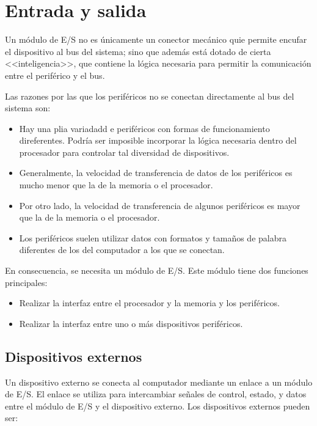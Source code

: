 \section{Entrada y salida}

Un módulo de E/S no es únicamente un conector mecánico quie permite encufar el dispositivo al bus del sistema; sino que además está dotado de cierta <<inteligencia>>, que contiene la lógica necesaria para permitir la comunicación entre el periférico y el bus.

Las razones por las que los periféricos no se conectan directamente al bus del sistema son:

\begin{itemize}
  \item Hay una plia variadadd e periféricos con formas de funcionamiento direferentes. Podría ser imposible incorporar la lógica necesaria dentro del procesador para controlar tal diversidad de dispositivos.
  \item Generalmente, la velocidad de transferencia de datos de los periféricos es mucho menor que la de la memoria o el procesador.
  \item Por otro lado, la velocidad de transferencia de algunos periféricos es mayor que la de la memoria o el procesador.
  \item Los periféricos suelen utilizar datos con formatos y tamaños de palabra diferentes de los del computador a los que se conectan.
\end{itemize}

En consecuencia, se necesita un módulo de E/S. Este módulo tiene dos funciones principales:

\begin{itemize}
  \item Realizar la interfaz entre el procesador y la memoria y los periféricos.
  \item Realizar la interfaz entre uno o más dispositivos periféricos.
\end{itemize}

\subsection{Dispositivos externos}

Un dispositivo externo se conecta al computador mediante un enlace a un módulo de E/S. El enlace se utiliza para intercambiar señales de control, estado, y datos entre el módulo de E/S y el dispositivo externo. Los dispositivos externos pueden ser:

